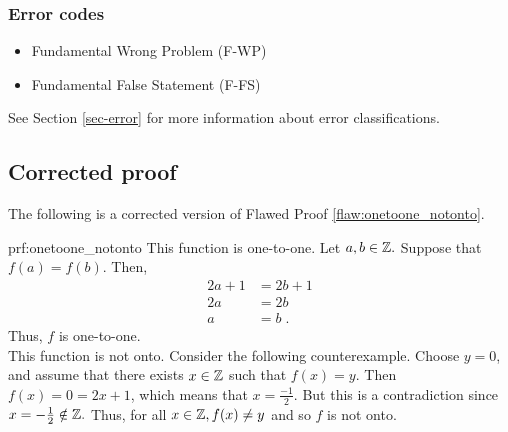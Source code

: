 
\subsubsection{Error codes}
\begin{itemize}
	\item 	Fundamental Wrong Problem (F-WP)
	\item   Fundamental False Statement (F-FS)
\end{itemize}
See Section \ref{sec-error} for more information about error classifications.

\clearpage
\subsection{Corrected proof}

The following is a corrected version of Flawed Proof \ref{flaw:onetoone_notonto}. %

\begin{prf}{prf:onetoone_notonto} %
This function is one-to-one. Let $a,b \in \mathbb Z.$ Suppose that $f(a)=f(b).$ Then,
\begin{align*}
2a + 1 &= 2b + 1 \\
2a &= 2b \\
a &= b\;.
\end{align*}
Thus, $f$ is one-to-one. \\

This function is not onto. Consider the following counterexample. Choose $y =0$, and assume that there exists $x \in \mathbb Z$ such that $f(x)=y.$ Then $f(x)=0 = 2x+1$, which means that $x = \frac{-1}{2}.$ But this is a contradiction since $x = -\frac{1}{2} \notin \mathbb Z.$ Thus, for all $x \in \mathbb Z, f(x) \neq y$ and so $f$ is not onto.
\end{prf}
